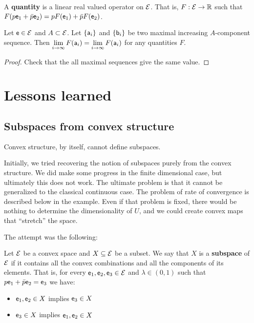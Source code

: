 \begin{defn}
	A \textbf{quantity} is a linear real valued operator on $\Ens$. That is, $F : \Ens \to \mathbb{R}$ such that $F(p \ens_1 + \bar{p} \ens_2) = p F(\ens_1) + \bar{p} F(\ens_2)$. 
\end{defn}

\begin{conj}
	Let $\ens \in \Ens$ and $A \subset \Ens$. Let $\{\ens[a]_i\}$ and $\{\ens[b]_i\}$ be two maximal increasing $A$-component sequence. Then $\lim\limits_{i \to \infty} F(\ens[a]_i) = \lim\limits_{i \to \infty} F(\ens[a]_i)$ for any quantities $F$.
\end{conj}

\begin{proof}
	Check that the all maximal sequences give the same value.
\end{proof}

\section{Lessons learned}

\subsection{Subspaces from convex structure}

\begin{insight}
	Convex structure, by itself, cannot define subspaces.
\end{insight}

Initially, we tried recovering the notion of subspaces purely from the convex structure. We did make some progress in the finite dimensional case, but ultimately this does not work. The ultimate problem is that it cannot be generalized to the classical continuous case. The problem of rate of convergence is described below in the example. Even if that problem is fixed, there would be nothing to determine the dimensionality of $U$, and we could create convex maps that ``stretch'' the space.

The attempt was the following:

\begin{defn}
	Let $\Ens$ be a convex space and $X \subseteq \Ens$ be a subset. We say that $X$ is a \textbf{subspace} of $\Ens$ if it contains all the convex combinations and all the components of its elements. That is, for every $\ens_1, \ens_2, \ens_3 \in \Ens$ and $\lambda \in (0,1)$ such that $p \ens_1 + \bar{p} \ens_2 = \ens_3$ we have:
	\begin{itemize}
		\item $\ens_1, \ens_2 \in X$ implies $\ens_3 \in X$
		\item $\ens_3 \in X$ implies $\ens_1, \ens_2 \in X$
	\end{itemize}
\end{defn}

